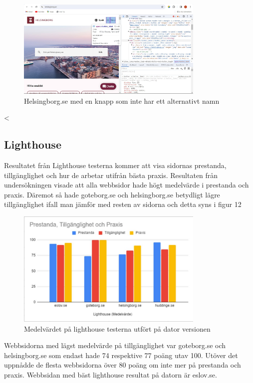 \documentclass[11p]{article}
\begin{document}
    \begin{figure}[hbt!]
        \includegraphics[width=0.8\textwidth]{../images/Helsingborg253.jpg}
        \caption{ Helsingborg.se med en knapp som inte har ett alternativt namn }
    \end{figure}
<
    \subsection{Lighthouse}

    Resultatet från Lighthouse testerna kommer att visa sidornas prestanda, tillgänglighet och hur de arbetar utifrån bästa praxis.
    Resultaten från undersökningen visade att alla webbsidor hade högt medelvärde i prestanda och praxis.
    Däremot så hade goteborg.se och helsingborg.se betydligt lägre tillgänglighet ifall man jämför med resten av sidorna och detta syns i figur 12

    \begin{figure}[hbt!]
        \includegraphics[width=0.8\textwidth]{../images/Medelvarde.jpg}
        \caption{ Medelvärdet på lighthouse testerna utfört på dator versionen }
    \end{figure}

    Webbsidorna med lägst medelvärde på tillgänglighet var goteborg.se och helsingborg.se som endast hade 74 respektive 77 poäng utav 100.
    Utöver det uppnådde de flesta webbsidorna över 80 poäng om inte mer på prestanda och praxis.
    Webbsidan med bäst lighthouse resultat på datorn är eslov.se.
\end{document}
